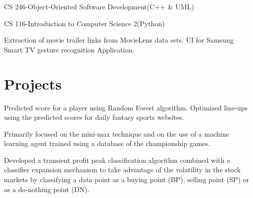 \documentclass[]{Vishnu-Resume}
\begin{document}
\begin{minipage}[t]{0.66\textwidth}
\begin{tightemize}\item CS 246-Object-Oriented Software Development(C++ & UML)
\item CS 116-Introduction to Computer Science 2(Python)
\end{tightemize}
\sectionsep

\begin{tightemize}\item Extraction of movie trailer links from MovieLens data sets. UI for Samsung Smart TV gesture recognition Application.
\end{tightemize}
\sectionsep

\section{Projects}
\descript{}
\location{}
Predicted score for a player using Random Forest algorithm. Optimized line-ups using the predicted
scores for daily fantasy sports websites.
\sectionsep

\location{}
Primarily focused on the mini-max technique and on the use of a machine learning agent trained
using a database of the championship games.
\sectionsep

\location{}
Developed a transient profit peak classification algorithm combined with a classifier expansion
mechanism to take advantage of the volatility in the stock markets by classifying a data point as a
buying point (BP), selling point (SP) or as a do-nothing point (DN).
\sectionsep

\end{minipage} 
\end{document}
